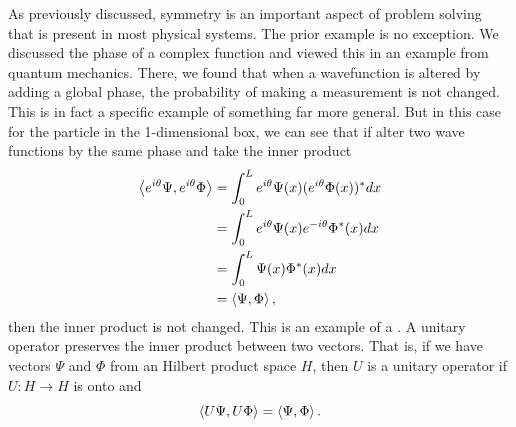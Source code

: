As previously discussed, symmetry is an important aspect of problem solving that is present in most physical systems.  The prior example is no exception.  We discussed the phase of a complex function and viewed this in an example from quantum mechanics.  There, we found that when a wavefunction is altered by adding a global phase, the probability of making a measurement is not changed.  This is in fact a specific example of something far more general.  But in this case for the particle in the 1-dimensional box, we can see that if alter two wave functions by the same phase and take the inner product
\begin{align*}
\left\langle e^{i\theta} \Psi, e^{i\theta}\Phi \right\rangle &= \int_0^L e^{i\theta} \Psi(x) (e^{i\theta}\Phi(x))^*dx \\
	&= \int_0^L e^{i\theta}\Psi(x)e^{-i\theta}\Phi^*(x)dx\\
	&= \int_0^L \Psi(x)\Phi^*(x)dx\\
	&= \left\langle \Psi, \Phi \right\rangle,
\end{align*}
then the inner product is not changed.  This is an example of a . A unitary operator preserves the inner product between two vectors. That is, if we have vectors $\Psi$ and $\Phi$ from an Hilbert product space $H$, then $U$ is a unitary operator if $U\colon H \to H$ is onto and
\[
\left\langle U\Psi, U \Phi \right\rangle = \left\langle \Psi, \Phi \right\rangle.
\]

